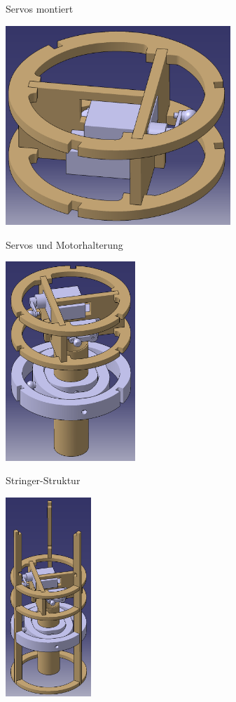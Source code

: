\documentclass{beamer}
\begin{document}
\begin{frame}{Servos montiert}
\begin{center}\includegraphics[height=75mm]{servo_2.png}\end{center}
\end{frame}

\begin{frame}{Servos und Motorhalterung}
\begin{center}\includegraphics[height=75mm]{servo_3.png}\end{center}
\end{frame}

\begin{frame}{Stringer-Struktur}
\begin{center}\includegraphics[height=75mm]{struktur_1.png}\end{center}
\end{frame}
\end{document}
